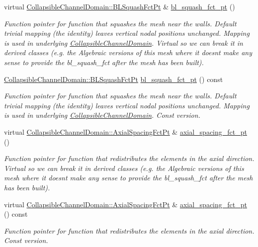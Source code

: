 \begin{DoxyCompactItemize}
virtual \hyperlink{classoomph_1_1CollapsibleChannelDomain_a2bf1d7943bfac134a5c27a54c7e1faed}{Collapsible\+Channel\+Domain\+::\+B\+L\+Squash\+Fct\+Pt} \& \hyperlink{classoomph_1_1CollapsibleChannelMesh_aac6057b4e572cb47923570b5e9c781c4}{bl\+\_\+squash\+\_\+fct\+\_\+pt} ()
\begin{DoxyCompactList}\small\item\em Function pointer for function that squashes the mesh near the walls. Default trivial mapping (the identity) leaves vertical nodal positions unchanged. Mapping is used in underlying \hyperlink{classoomph_1_1CollapsibleChannelDomain}{Collapsible\+Channel\+Domain}. Virtual so we can break it in derived classes (e.\+g. the Algebraic versions of this mesh where it doesn\textquotesingle{}t make any sense to provide the bl\+\_\+squash\+\_\+fct after the mesh has been built). \end{DoxyCompactList}\item 
\hyperlink{classoomph_1_1CollapsibleChannelDomain_a2bf1d7943bfac134a5c27a54c7e1faed}{Collapsible\+Channel\+Domain\+::\+B\+L\+Squash\+Fct\+Pt} \hyperlink{classoomph_1_1CollapsibleChannelMesh_a5c073c93cce7e6b6e9de86f36cb1e965}{bl\+\_\+squash\+\_\+fct\+\_\+pt} () const
\begin{DoxyCompactList}\small\item\em Function pointer for function that squashes the mesh near the walls. Default trivial mapping (the identity) leaves vertical nodal positions unchanged. Mapping is used in underlying \hyperlink{classoomph_1_1CollapsibleChannelDomain}{Collapsible\+Channel\+Domain}. Const version. \end{DoxyCompactList}\item 
virtual \hyperlink{classoomph_1_1CollapsibleChannelDomain_a317472dab112beac771ecf6442a465f5}{Collapsible\+Channel\+Domain\+::\+Axial\+Spacing\+Fct\+Pt} \& \hyperlink{classoomph_1_1CollapsibleChannelMesh_ac7913dca6b8b11240caede54414f3c11}{axial\+\_\+spacing\+\_\+fct\+\_\+pt} ()
\begin{DoxyCompactList}\small\item\em Function pointer for function that redistributes the elements in the axial direction. Virtual so we can break it in derived classes (e.\+g. the Algebraic versions of this mesh where it doesn\textquotesingle{}t make any sense to provide the bl\+\_\+squash\+\_\+fct after the mesh has been built). \end{DoxyCompactList}\item 
virtual \hyperlink{classoomph_1_1CollapsibleChannelDomain_a317472dab112beac771ecf6442a465f5}{Collapsible\+Channel\+Domain\+::\+Axial\+Spacing\+Fct\+Pt} \& \hyperlink{classoomph_1_1CollapsibleChannelMesh_a7a615ef1fcb4cb422e3c78267818ceec}{axial\+\_\+spacing\+\_\+fct\+\_\+pt} () const
\begin{DoxyCompactList}\small\item\em Function pointer for function that redistributes the elements in the axial direction. Const version. \end{DoxyCompactList}\end{DoxyCompactItemize}
